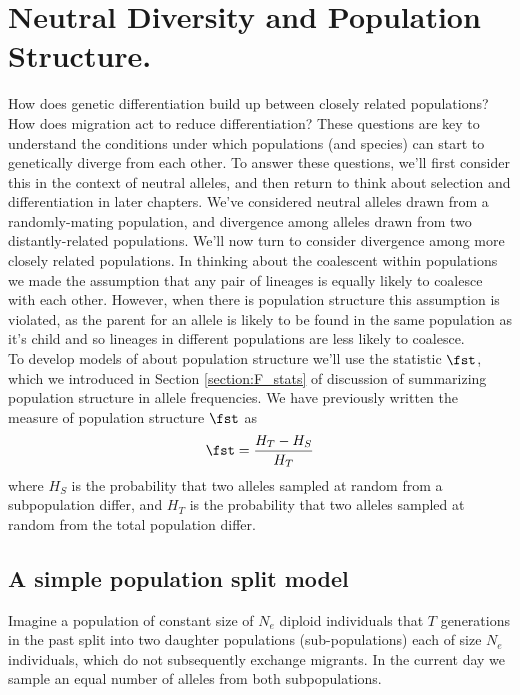 \chapter{Neutral Diversity and Population Structure.}

How does genetic differentiation build up between closely related
populations? How does migration act to reduce differentiation? These
questions are key to understand the conditions under which populations
(and species) can start to genetically diverge from each other. To answer these
questions, we'll first consider this in the context of neutral alleles, and then return
to think about selection and differentiation in later chapters. 
We've considered neutral alleles drawn from a randomly-mating population, and divergence among alleles drawn from two distantly-related populations.
We'll now turn to consider divergence among more closely related
populations. In thinking about the coalescent within populations we
made the assumption that any pair of lineages is equally likely to
coalesce with each other. However, when there is population structure
this assumption is violated, as the parent for an allele is 
likely to be found in the same population as it's child and so
lineages in different populations are less likely to coalesce. \\

To develop models of about population structure we'll use the
statistic $\fst$, which we introduced in Section \ref{section:F_stats}
of discussion of summarizing
population structure in allele frequencies. We have previously written the measure of population structure
$\fst$ as
\begin{equation}
\fst = \frac{H_T-H_S}{H_T}
\end{equation}
where $H_S$ is the probability that two alleles sampled at random from a
subpopulation differ, and $H_T$ is the probability that two alleles
sampled at random from the total population differ.

\section{A simple population split model}
Imagine a population of constant size of $N_e$ diploid individuals that
$T$ generations in the past split into two daughter populations (sub-populations)
each of size $N_e$ individuals, which do not subsequently exchange
migrants. In the current day we sample an equal number of alleles
from both subpopulations.

